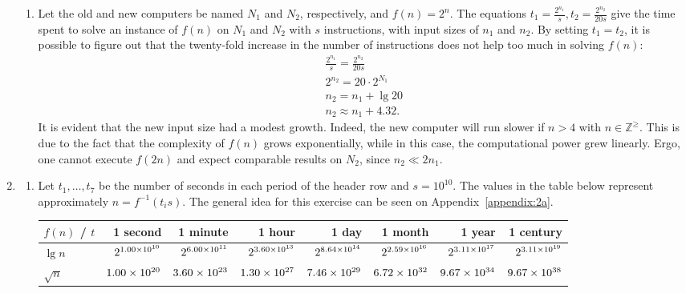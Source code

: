 \documentclass[12pt]{article}
\newcommand{\intwzero}{\mathbb{Z}^{\geq}}
\begin{document}
\begin{enumerate}
\begin{enumerate}
    \item Let the old and new computers be named $N_{1}$ and $N_{2}$, respectively, and $f(n) = 2^{n}$. The equations $t_{1} = \frac{2^{n_{1}}}{s}, t_{2} = \frac{2^{n_{2}}}{20s}$ give the time spent to solve an instance of $f(n)$ on $N_{1}$ and $N_{2}$ with $s$ instructions, with input sizes of $n_{1}$ and $n_{2}$. By setting $t_{1} = t_{2}$, it is possible to figure out that the twenty-fold increase in the number of instructions does not help too much in solving $f(n)$:
    \begin{align*}
      \tfrac{2^{n_{1}}}{s} = \tfrac{2^{n_{2}}}{20s} \\
      2^{n_{2}} = 20 \cdot 2^{N_{1}} \\
      n_{2} = n_{1} + \lg 20 \\
      n_{2} \approx n_{1} + 4.32.
    \end{align*}
    It is evident that the new input size had a modest growth. Indeed, the new computer will run slower if $n > 4$ with $n \in \intwzero$. This is due to the fact that the complexity of $f(n)$ grows exponentially, while in this case, the computational power grew linearly. Ergo, one cannot execute $f(2n)$ and expect comparable results on $N_{2}$, since $n_{2} \ll 2 n_{1}$.
  \end{enumerate}
  \item 
  \begin{enumerate}\label{ex:2a}
    \item Let $t_{1}, \dots, t_{7}$ be the number of seconds in each period of the header row and $s = 10^{10}$. The values in the table below represent approximately $n = f^{-1}(t_{i} s)$. The general idea for this exercise can be seen on Appendix~\ref{appendix:2a}.
    \begin{table}[htbp]
      \renewcommand{\arraystretch}{1.2}
      \setlength{\tabcolsep}{7pt}
      \centering
      \footnotesize
      \begin{tabular}{l*{7}{r}}
        \toprule
        $f(n)$ / $t$ & 1 second & 1 minute & 1 hour & 1 day & 1 month & 1 year & 1 century \\ \midrule
        $   \lg n$ & $2^{\num{1.00E+10}}$ & $2^{\num{6.00E+11}}$ & $2^{\num{3.60E+13}}$ & $2^{\num{8.64E+14}}$ & $2^{\num{2.59E+16}}$ & $2^{\num{3.11E+17}}$ & $2^{\num{3.11E+19}}$ \\
        $\sqrt{n}$ & $\num{1.00E+20}$ & $\num{3.60E+23}$ & $\num{1.30E+27}$ & $\num{7.46E+29}$ & $\num{6.72E+32}$ & $\num{9.67E+34}$ & $\num{9.67E+38}$ \\

\end{tabular}
\end{table}
\end{enumerate}
\end{enumerate}
\end{document}

